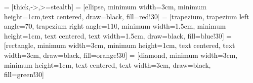  = [thick,->,>=stealth]
 = [ellipse, minimum width=3cm, minimum height=1cm,text centered, draw=black, fill=red!30]
 = [trapezium, trapezium left angle=70, trapezium right angle=110, minimum width=1.5cm, minimum height=1cm, text centered, text width=1.5cm, draw=black, fill=blue!30]
 = [rectangle, minimum width=3cm, minimum height=1cm, text centered, text width=3cm, draw=black, fill=orange!30]
 = [diamond, minimum width=3cm, minimum height=1cm, text centered, text width=3cm, draw=black, fill=green!30]

